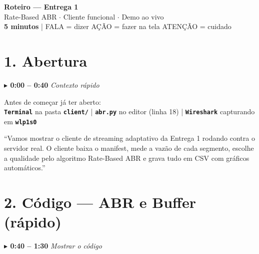 \documentclass[12pt,a4paper]{article}
\newcommand{\cmd}[1]{\texttt{\textbf{#1}}}
\newcommand{\tempo}[2]{%
  \vspace{5pt}
  \begin{tcolorbox}[base,colback=ctempo!8,colframe=ctempo,boxrule=1pt,
    left=6pt,right=6pt,top=2pt,bottom=2pt]
  \textcolor{ctempo}{\textbf{$\blacktriangleright$ #1}}%
  \hfill\textcolor{ctempo}{\small\textit{#2}}
  \end{tcolorbox}\vspace{3pt}}
\begin{document}
\begin{tcolorbox}[colback=cfala!10,colframe=cfala,boxrule=2pt,arc=4pt,
  left=10pt,right=10pt,top=8pt,bottom=8pt]
\begin{center}
  {\LARGE\bfseries\color{cfala} Roteiro — Entrega 1}\\[4pt]
  {\large Rate-Based ABR $\cdot$ Cliente funcional $\cdot$ Demo ao vivo}\\[2pt]
  \textbf{5 minutos} \quad|\quad
  \small\textcolor{cfala}{FALA = dizer}\quad
  \textcolor{cacao}{AÇÃO = fazer na tela}\quad
  \textcolor{catencao}{ATENÇÃO = cuidado}
\end{center}
\end{tcolorbox}

\vspace{4pt}

\section{1. Abertura}

\tempo{0:00 – 0:40}{Contexto rápido}

\begin{acaobox}
Antes de começar já ter aberto:\\
\cmd{Terminal} na pasta \cmd{client/} \quad|\quad
\cmd{abr.py} no editor (linha 18) \quad|\quad
\cmd{Wireshark} capturando em \cmd{wlp1s0}
\end{acaobox}

\vspace{3pt}

\begin{falabox}
``Vamos mostrar o cliente de streaming adaptativo da Entrega 1 rodando contra
o servidor real. O cliente baixa o manifest, mede a vazão de cada segmento,
escolhe a qualidade pelo algoritmo Rate-Based ABR e grava tudo em CSV com
gráficos automáticos.''
\end{falabox}

\section{2. Código — ABR e Buffer (rápido)}

\tempo{0:40 – 1:30}{Mostrar o código}
\end{document}
